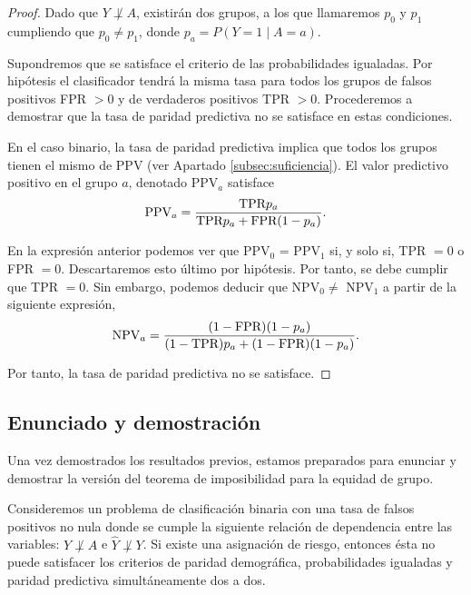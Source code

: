 \documentclass[oneside,openright,titlepage,numbers=noenddot,openany,headinclude,footinclude=true,
cleardoublepage=empty,abstractoff,BCOR=5mm,paper=a4,fontsize=12pt,main=spanish]{scrreprt}
\begin{document}
\begin{proof}
Dado que $Y \not \perp A$, existirán dos grupos, a los que llamaremos $p_0$ y $p_1$ cumpliendo que $p_0\neq p_1$, donde $p_a=P(Y=1 \mid A=a)$.

Supondremos que se satisface el criterio de las probabilidades igualadas. Por hipótesis el clasificador tendrá la misma tasa para todos los grupos de falsos positivos FPR $> 0$ y de verdaderos positivos TPR $> 0$. Procederemos a demostrar que la tasa de paridad predictiva no se satisface en estas condiciones.

En el caso binario, la tasa de paridad predictiva implica que todos los grupos tienen el mismo de PPV (ver Apartado \ref{subsec:suficiencia}). El valor predictivo positivo en el grupo $a$, denotado PPV$_a$ satisface
\begin{equation*}
    \text{PPV}_a = \frac{\displaystyle \text{TPR}p_a}{\displaystyle \text{TPR}p_a+\text{FPR}(1-p_a)}.
\end{equation*}

En la expresión anterior podemos ver que PPV$_0$ = PPV$_1$ si, y solo si, TPR $= 0$ o FPR $= 0$. Descartaremos esto último por hipótesis. Por tanto, se debe cumplir que TPR $= 0$.  Sin embargo, podemos deducir que NPV$_0 \neq$ NPV$_1$ a partir de la siguiente expresión,
\begin{equation*}
    \text{NPV}_a = \frac{\displaystyle (1-\text{FPR})(1-p_a)}{\displaystyle (1-\text{TPR})p_a+(1-\text{FPR})(1-p_a)}.
\end{equation*}

Por tanto, la tasa de paridad predictiva no se satisface.
\end{proof}

\subsection{Enunciado y demostración}

Una vez demostrados los resultados previos, estamos preparados para enunciar y demostrar la versión del teorema de imposibilidad para la equidad de grupo.\\

\begin{theorem} \label{th:teoimpos}
Consideremos un problema de clasificación binaria con una tasa de falsos positivos no nula donde se cumple la siguiente relación de dependencia entre las variables: $Y \not \perp A$ e $\hat{Y} \not \perp Y$. Si existe una asignación de riesgo, entonces ésta no puede satisfacer los criterios de paridad demográfica, probabilidades igualadas y paridad predictiva simultáneamente dos a dos.
\end{theorem}
\end{document}
